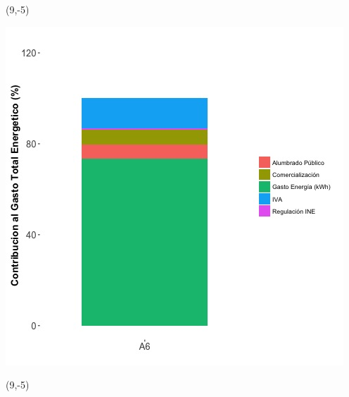 \documentclass{article}\usepackage[]{graphicx}\usepackage[]{color}
\newenvironment{knitrout}{}{} %
\begin{document}
 \begin{textblock}{1}(9,-5)
\begin{minipage}{20em}
\begingroup

\endgroup
\end{minipage}
\end{textblock}

\begin{knitrout}
\color{fgcolor}
\includegraphics[scale=0.65]{figure/A6_costvars_plot.jpg} 
\end{knitrout}

 \begin{textblock}{1}(9,-5)
\begin{minipage}{20em}
\begingroup

\endgroup
\end{minipage}
\end{textblock}
\end{document}
